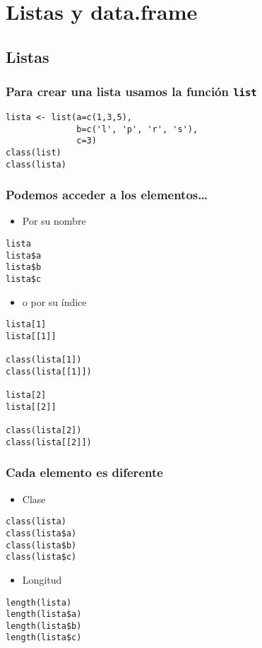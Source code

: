 \documentclass{beamer}
\begin{document}
\section{Listas y data.frame}
\label{sec-3}
\subsection{Listas}
\label{sec-3-1}
\begin{frame}[fragile]
\frametitle{Para crear una lista usamos la función \texttt{list}}
\label{sec-3-1-1}


\lstset{language=R}
\begin{lstlisting}
lista <- list(a=c(1,3,5),
              b=c('l', 'p', 'r', 's'),
              c=3)
class(list)
class(lista)
\end{lstlisting}
\end{frame}
\begin{frame}[fragile]
\frametitle{Podemos acceder a los elementos\ldots{}}
\label{sec-3-1-2}

\begin{itemize}
\item Por su nombre
\end{itemize}

\lstset{language=R}
\begin{lstlisting}
lista
lista$a
lista$b
lista$c
\end{lstlisting}

\begin{itemize}
\item o por su índice
\end{itemize}

\lstset{language=R}
\begin{lstlisting}
lista[1]
lista[[1]]

class(lista[1])
class(lista[[1]])

lista[2]
lista[[2]]

class(lista[2])
class(lista[[2]])
\end{lstlisting}
\end{frame}
\begin{frame}[fragile]
\frametitle{Cada elemento es diferente}
\label{sec-3-1-3}

\begin{itemize}
\item Clase
\end{itemize}

\lstset{language=R}
\begin{lstlisting}
class(lista)
class(lista$a)
class(lista$b)
class(lista$c)
\end{lstlisting}
\begin{itemize}
\item Longitud
\end{itemize}

\lstset{language=R}
\begin{lstlisting}
length(lista)
length(lista$a)
length(lista$b)
length(lista$c)
\end{lstlisting}
\end{frame}
\end{document}
